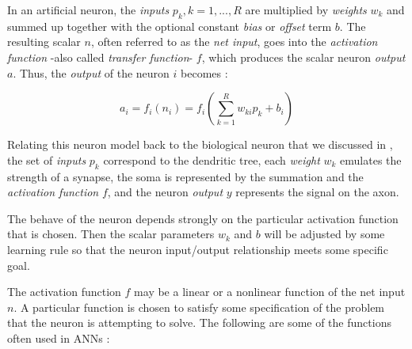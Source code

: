 In an artificial neuron, the \emph{inputs} $p_{k}, k=1,...,R$ are multiplied by \emph{weights} $w_{k}$ and summed up together with the optional constant \emph{bias} or \emph{offset} term $b$. The resulting scalar $n$, often referred to as the \emph{net input}, goes into the \emph{activation function} -also called \emph{transfer function}- $f$, which produces the scalar neuron \emph{output} $a$.
Thus, the \emph{output} of the neuron $i$ becomes \cite{Demuth:2014:NND:2721661}:

\begin{equation}
a_{i}=f_{i}(n_{i})=f_{i}(\sum_{k=1}^R w_{ki}p_{k}+b_{i})
\label{eq:expandedgeneralneuroneq}
\end{equation}

Relating this neuron model back to the biological neuron that we discussed in , the set of \emph{inputs} $p_{k}$ correspond to the dendritic tree,
each \emph{weight} $w_{k}$ emulates the strength of a synapse, the soma is represented by the summation and the \emph{activation function} $f$,
and the neuron \emph{output} $y$ represents the signal on the axon.

The behave of the neuron depends strongly on the particular activation function that is chosen. Then the scalar parameters $w_{k}$ and $b$ will be adjusted by some learning rule so that the neuron input/output relationship meets some specific goal.

The activation function $f$ may be a linear or a nonlinear function of the net input $n$. 
A particular function is chosen to satisfy some specification of the problem that the neuron is attempting to solve. The following are some of the functions often used in ANNs \cite{Demuth:2014:NND:2721661}:

